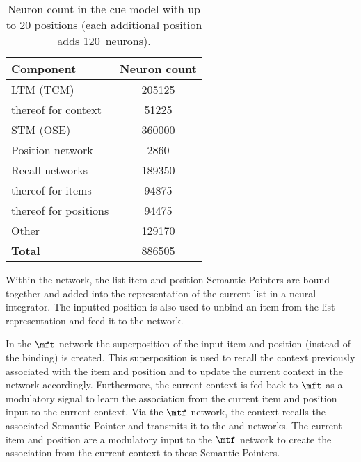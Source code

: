 \begin{table}
    \centering
    \caption[Neuron count in the CUE model.]{Neuron count in the cue model with up to 20 positions (each additional position adds \num{120}~neurons).}\label{tbl:nneurons}
    \begin{tabular}{lS}
        \toprule
        Component & {Neuron count} \\
        \midrule
        LTM (TCM) & 205125 \\
        \hspace{1em} thereof for context & 51225 \\
        STM (OSE) & 360000 \\
        Position network & 2860 \\
        Recall networks & 189350 \\
        \hspace{1em} thereof for items & 94875 \\
        \hspace{1em} thereof for positions & 94475 \\
        Other & 129170 \\
        \addlinespace
        \textbf{Total} & 886505 \\
        \bottomrule
    \end{tabular}
\end{table}

Within the  network, the list item and position Semantic Pointers are bound together and added into the representation of the current list in a neural integrator.
The inputted position is also used to unbind an item from the list representation and feed it to the  network.

In the $\mft$ network the superposition of the input item and position (instead of the binding) is created.
This superposition is used to recall the context previously associated with the item and position and to update the current context in the  network accordingly.
Furthermore, the current context is fed back to $\mft$ as a modulatory signal to learn the association from the current item and position input to the current context.
Via the $\mtf$ network, the context recalls the associated Semantic Pointer and transmits it to the  and  networks.
The current item and position are a modulatory input to the $\mtf$ network to create the association from the current context to these Semantic Pointers.

